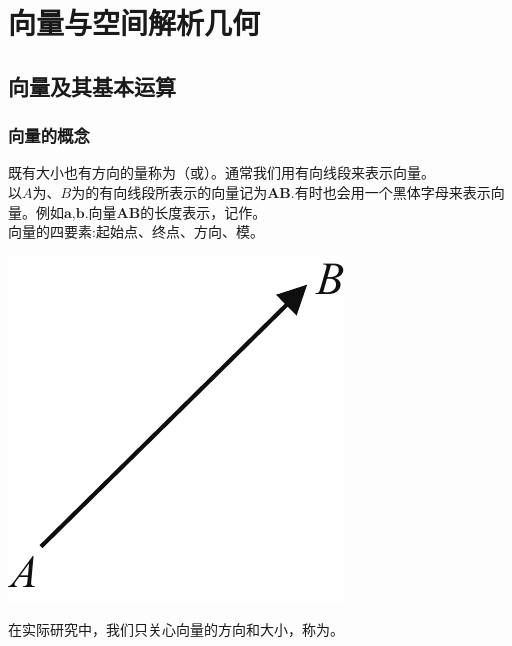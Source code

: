 \chapter{向量与空间解析几何}
\section{向量及其基本运算}
\subsection{向量的概念}
\noindent
\begin{minipage}{0.6\linewidth}
\hspace*{2em} 既有大小也有方向的量称为（或）。通常我们用有向线段来表示向量。\\
\hspace*{2em} 以$A$为、$B$为的有向线段所表示的向量记为$\boldsymbol{AB}$.有时也会用一个黑体字母来表示向量。例如$\boldsymbol{a}$,$\boldsymbol{b}$.向量$\boldsymbol{AB}$的长度表示，记作。\\
\hspace*{2em} 向量的四要素:起始点、终点、方向、模。
\end{minipage}
\begin{minipage}{0.4\linewidth}
	\centering
	\includegraphics[width = 0.45\linewidth]{pic/C-5/vec}
	\vspace*{-1em}
	\label{向量示意图}
\end{minipage}

在实际研究中，我们只关心向量的方向和大小，称为。\\

